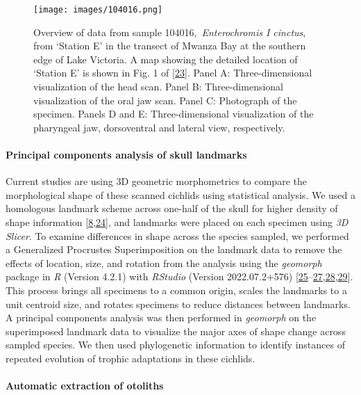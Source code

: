 \begin{figure}
\hypertarget{fig:104016}{%
\centering
\texttt{[image: images/104016.png]}
\caption{Overview of data from sample 104016,~\emph{Enterochromis I cinctus}, from `Station E' in the transect of Mwanza Bay at the southern edge of Lake Victoria.
A map showing the detailed location of `Station E' is shown in Fig. 1 of {[}\protect\hyperlink{ref-JtHcU2O2}{23}{]}.
Panel A: Three-dimensional visualization of the head scan.
Panel B: Three-dimensional visualization of the oral jaw scan.
Panel C: Photograph of the specimen.
Panels D and E: Three-dimensional visualization of the pharyngeal jaw, dorsoventral and lateral view, respectively.}\label{fig:104016}
}
\end{figure}

\hypertarget{principal-components-analysis-of-skull-landmarks}{%
\paragraph{Principal components analysis of skull landmarks}\label{principal-components-analysis-of-skull-landmarks}}

Current studies are using 3D geometric morphometrics to compare the morphological shape of these scanned cichlids using statistical analysis.
We used a homologous landmark scheme across one-half of the skull for higher density of shape information {[}\protect\hyperlink{ref-BDrCSu8p}{8},\protect\hyperlink{ref-15FafMZm5}{24}{]}, and landmarks were placed on each specimen using \emph{3D Slicer}.
To examine differences in shape across the species sampled, we performed a Generalized Procrustes Superimposition on the landmark data to remove the effects of location, size, and rotation from the analysis using the \emph{geomorph} package in \emph{R} (Version 4.2.1) with \emph{RStudio} (Version 2022.07.2+576) {[}\protect\hyperlink{ref-VPUOQA2P}{25}--\protect\hyperlink{ref-EwNL0C0Y}{27},\protect\hyperlink{ref-whEyWyQh}{28},\protect\hyperlink{ref-QfVloFVu}{29}{]}.
This process brings all specimens to a common origin, scales the landmarks to a unit centroid size, and rotates specimens to reduce distances between landmarks.
A principal components analysis was then performed in \emph{geomorph} on the superimposed landmark data to visualize the major axes of shape change across sampled species.
We then used phylogenetic information to identify instances of repeated evolution of trophic adaptations in these cichlids.

\hypertarget{automatic-extraction-of-otoliths}{%
\paragraph{Automatic extraction of otoliths}\label{automatic-extraction-of-otoliths}}

